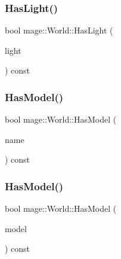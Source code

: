 \subsubsection{\texorpdfstring{Has\+Light()}{HasLight()}\hspace{0.1cm}{\footnotesize\ttfamily [2/2]}}
{\footnotesize\ttfamily bool mage\+::\+World\+::\+Has\+Light (\begin{DoxyParamCaption}\item[{const \hyperlink{namespacemage_a1e01ae66713838a7a67d30e44c67703e}{Shared\+Ptr}$<$ \hyperlink{classmage_1_1_point_light}{Point\+Light} $>$}]{light }\end{DoxyParamCaption}) const}

\hypertarget{classmage_1_1_world_a381e0a56fc1ba6d0955a248f7b0f0c22}{}\label{classmage_1_1_world_a381e0a56fc1ba6d0955a248f7b0f0c22} 
\subsubsection{\texorpdfstring{Has\+Model()}{HasModel()}\hspace{0.1cm}{\footnotesize\ttfamily [1/2]}}
{\footnotesize\ttfamily bool mage\+::\+World\+::\+Has\+Model (\begin{DoxyParamCaption}\item[{const string \&}]{name }\end{DoxyParamCaption}) const}

\hypertarget{classmage_1_1_world_a821d420241b2a94502b20e24595490df}{}\label{classmage_1_1_world_a821d420241b2a94502b20e24595490df} 
\subsubsection{\texorpdfstring{Has\+Model()}{HasModel()}\hspace{0.1cm}{\footnotesize\ttfamily [2/2]}}
{\footnotesize\ttfamily bool mage\+::\+World\+::\+Has\+Model (\begin{DoxyParamCaption}\item[{const \hyperlink{namespacemage_a1e01ae66713838a7a67d30e44c67703e}{Shared\+Ptr}$<$ \hyperlink{classmage_1_1_model}{Model} $>$}]{model }\end{DoxyParamCaption}) const}

\hypertarget{classmage_1_1_world_a48964d5262a080dd866e612d7daa6bf2}{}\label{classmage_1_1_world_a48964d5262a080dd866e612d7daa6bf2} 
